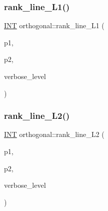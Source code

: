 \mbox{\label{classorthogonal_a2d89d504dee5256f035591c1cb64e129}} 
\subsubsection{\texorpdfstring{rank\+\_\+line\+\_\+\+L1()}{rank\_line\_L1()}}
{\footnotesize\ttfamily \mbox{\hyperlink{galois_8h_a09fddde158a3a20bd2dcadb609de11dc}{I\+NT}} orthogonal\+::rank\+\_\+line\+\_\+\+L1 (\begin{DoxyParamCaption}\item[{\mbox{\hyperlink{galois_8h_a09fddde158a3a20bd2dcadb609de11dc}{I\+NT}}}]{p1,  }\item[{\mbox{\hyperlink{galois_8h_a09fddde158a3a20bd2dcadb609de11dc}{I\+NT}}}]{p2,  }\item[{\mbox{\hyperlink{galois_8h_a09fddde158a3a20bd2dcadb609de11dc}{I\+NT}}}]{verbose\+\_\+level }\end{DoxyParamCaption})}

\mbox{\label{classorthogonal_abd9adb280933c973c9288e2764f72256}} 
\subsubsection{\texorpdfstring{rank\+\_\+line\+\_\+\+L2()}{rank\_line\_L2()}}
{\footnotesize\ttfamily \mbox{\hyperlink{galois_8h_a09fddde158a3a20bd2dcadb609de11dc}{I\+NT}} orthogonal\+::rank\+\_\+line\+\_\+\+L2 (\begin{DoxyParamCaption}\item[{\mbox{\hyperlink{galois_8h_a09fddde158a3a20bd2dcadb609de11dc}{I\+NT}}}]{p1,  }\item[{\mbox{\hyperlink{galois_8h_a09fddde158a3a20bd2dcadb609de11dc}{I\+NT}}}]{p2,  }\item[{\mbox{\hyperlink{galois_8h_a09fddde158a3a20bd2dcadb609de11dc}{I\+NT}}}]{verbose\+\_\+level }\end{DoxyParamCaption})}

\mbox{\label{classorthogonal_a45ebd133d98a13f8c10e1ff0310874a9}} 
